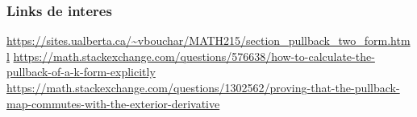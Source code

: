 \documentclass{beamer}
\begin{document}
\begin{frame}
\frametitle{Links de interes}
\url{https://sites.ualberta.ca/~vbouchar/MATH215/section_pullback_two_form.html}
\url{https://math.stackexchange.com/questions/576638/how-to-calculate-the-pullback-of-a-k-form-explicitly}
\url{https://math.stackexchange.com/questions/1302562/proving-that-the-pullback-map-commutes-with-the-exterior-derivative}
\end{frame}
\end{document}
